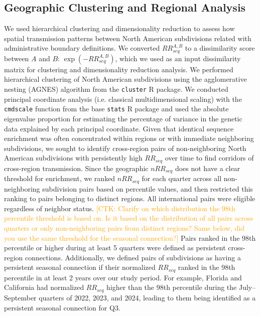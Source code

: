 \documentclass[11pt, letterpaper, oneside]{article}
\def\ctkc#1{\textcolor{orange}{[CTK: #1]}}
\begin{document}
\subsection{Geographic Clustering and Regional Analysis}

We used hierarchical clustering and dimensionality reduction to assess how spatial transmission patterns between North American subdivisions related with administrative boundary definitions.
We converted $RR_{seq}^{A,B}$ to a dissimilarity score between $A$ and $B$: $\exp{(-RR_{seq}^{A,B})}$, which we used as an input dissimilarity matrix for clustering and dimensionality reduction analysis.
We performed hierarchical clustering of North American subdivisions using the agglomerative nesting (AGNES) algorithm from the \texttt{cluster} R package.\autocite{maechlerClusterClusterAnalysis2026}
We conducted principal coordinate analysis (i.e. classical multidimensional scaling) with the \texttt{cmdscale} function from the base \texttt{stats} R package\autocite{rcoreteamLanguageEnvironmentStatistical2025} and used the absolute eigenvalue proportion for estimating the percentage of variance in the genetic data explained by each principal coordinate.
Given that identical sequence enrichment was often concentrated within regions or with immediate neighboring subdivisions, we sought to identify cross-region pairs of non-neighboring North American subdivisions with persistently high $RR_{seq}$ over time to find corridors of cross-region transmission.
Since the geographic $nRR_{seq}$ does not have a clear threshold for enrichment, we ranked $nRR_{seq}$ for each quarter across all non-neighboring subdivision pairs based on percentile values, and then restricted this ranking to pairs belonging to distinct regions.
All international pairs were eligible regardless of neighbor status.
\ctkc{Clarify on which distribution the 98th percentile threshold is based on. Is it based on the distribution of all pairs across quarters or only non-neighboring pairs from distinct regions? Same below, did you use the same threshold for the seasonal connection?}
Pairs ranked in the 98th percentile or higher during at least 5 quarters were defined as persistent cross-region connections.
Additionally, we defined pairs of subdivisions as having a persistent seasonal connection if their normalized $RR_{seq}$ ranked in the 98th percentile in at least 2 years over our study period.
For example, Florida and California had normalized $RR_{seq}$ higher than the 98th percentile during the July--September quarters of 2022, 2023, and 2024, leading to them being identified as a persistent seasonal connection for Q3.
\end{document}
